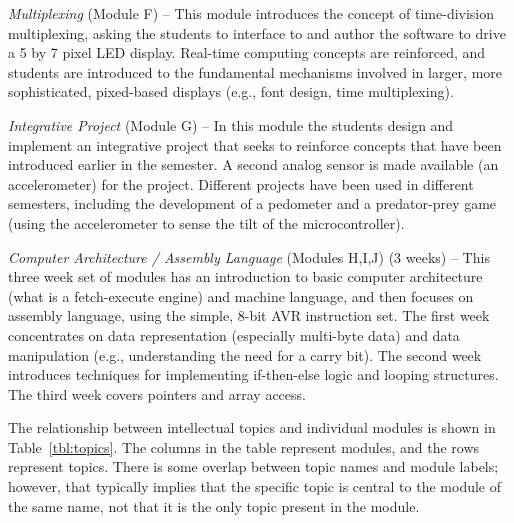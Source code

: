 \emph{Multiplexing} (Module F) --
This module introduces the concept of time-division multiplexing, asking the
students to interface to and author the software to drive a 5 by 7 pixel
LED display. Real-time computing concepts are reinforced, and students
are introduced to the fundamental mechanisms involved in larger, more
sophisticated, pixed-based displays (e.g., font design, time multiplexing).

\emph{Integrative Project} (Module G) --
In this module the students design and implement an integrative project
that seeks to reinforce concepts that have been introduced earlier in the
semester.  A second analog sensor is made available (an accelerometer)
for the project.
Different projects have been used in different semesters, including
the development of a pedometer and a predator-prey game (using the
accelerometer to sense the tilt of the microcontroller).

\emph{Computer Architecture / Assembly Language} (Modules H,I,J) (3 weeks) --
This three week set of modules has an introduction to basic computer
architecture (what is a fetch-execute engine) and machine language, and then
focuses on assembly language, using the simple, 8-bit AVR instruction set.
The first week concentrates on data representation (especially multi-byte
data) and data manipulation
(e.g., understanding the need for a carry bit).
The second week introduces techniques for implementing if-then-else logic
and looping structures.
The third week covers pointers and array access.

The relationship between intellectual topics and individual modules is
shown in Table~\ref{tbl:topics}. The columns in the table represent
modules, and the rows represent topics.
There is some overlap between topic names and module labels; however, that
typically implies that the specific topic is central to the module of the
same name, not that it is the only topic present in the module.

